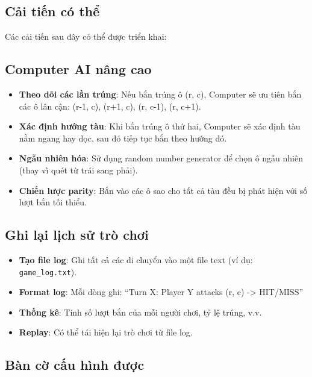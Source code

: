 \subsection{Cải tiến có thể}

Các cải tiến sau đây có thể được triển khai:

\subsection{Computer AI nâng cao}

\begin{itemize}
    \item \textbf{Theo dõi các lần trúng}: Nếu bắn trúng ô (r, c), Computer sẽ ưu tiên bắn các ô lân cận: (r-1, c), (r+1, c), (r, c-1), (r, c+1).
    
    \item \textbf{Xác định hướng tàu}: Khi bắn trúng ô thứ hai, Computer sẽ xác định tàu nằm ngang hay dọc, sau đó tiếp tục bắn theo hướng đó.
    
    \item \textbf{Ngẫu nhiên hóa}: Sử dụng random number generator để chọn ô ngẫu nhiên (thay vì quét từ trái sang phải).
    
    \item \textbf{Chiến lược parity}: Bắn vào các ô sao cho tất cả tàu đều bị phát hiện với số lượt bắn tối thiểu.
\end{itemize}

\subsection{Ghi lại lịch sử trò chơi}

\begin{itemize}
    \item \textbf{Tạo file log}: Ghi tất cả các di chuyển vào một file text (ví dụ: \texttt{game\_log.txt}).
    
    \item \textbf{Format log}: Mỗi dòng ghi: ``Turn X: Player Y attacks (r, c) -> HIT/MISS''
    
    \item \textbf{Thống kê}: Tính số lượt bắn của mỗi người chơi, tỷ lệ trúng, v.v.
    
    \item \textbf{Replay}: Có thể tái hiện lại trò chơi từ file log.
\end{itemize}

\subsection{Bàn cờ cấu hình được}

